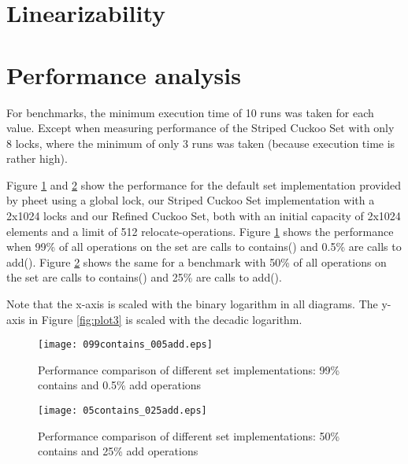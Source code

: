 \documentclass[a4paper,10pt]{article}
\begin{document}
\section{Linearizability}
\label{serc:linearizability}

\section{Performance analysis}
\label{sec:performance}
For benchmarks, the minimum execution time of 10 runs was taken for each value.
Except when measuring performance of the Striped Cuckoo Set with only 8 locks,
where the minimum of only 3 runs was taken (because execution time is rather
high).

Figure \ref{fig:plot1} and \ref{fig:plot2} show the performance for the default
set implementation provided by pheet using a global lock, our Striped Cuckoo
Set implementation with a 2x1024 locks and our Refined Cuckoo Set, both with an
initial capacity of 2x1024 elements and a limit of 512 relocate-operations.
Figure \ref{fig:plot1} shows the performance when 99\% of all operations on the
set are calls to contains() and 0.5\% are calls to add(). Figure
\ref{fig:plot2} shows the same for a benchmark with 50\% of all operations on
the set are calls to contains() and 25\% are calls to add().

Note that the x-axis is scaled with the binary logarithm in all diagrams. The
y-axis in Figure \ref{fig:plot3} is scaled with the decadic logarithm.

\begin{comment}
todo:
- which variant performs better when?
- asymptotic behaviour
- where is the cross-over point?
- anything unexpected?

\end{comment}


\begin{figure}[H]
\begin{center}
\texttt{[image: 099contains\_005add.eps]}
\end{center}
\caption{Performance comparison of different set implementations: 99\% contains and 0.5\% add operations}
\label{fig:plot1}
\end{figure}

\begin{figure}[H]
\begin{center}
\texttt{[image: 05contains\_025add.eps]}
\end{center}
\caption{Performance comparison of different set implementations: 50\% contains and 25\% add operations}
\label{fig:plot2}
\end{figure}
\end{document}
